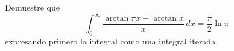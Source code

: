 \item Demuestre que
    \[ \int_0^\infty \frac{\arctan \pi x - \arctan x}{x} \, dx = \frac{\pi}{2} \ln \pi \]
    expresando primero la integral como una integral iterada.
